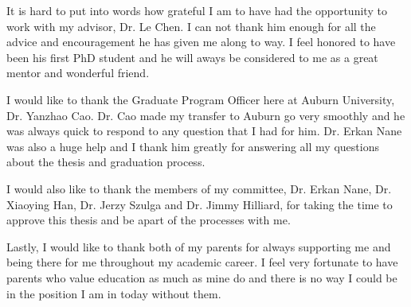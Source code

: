 \documentclass[12pt]{report}
\theoremstyle{plain}
\theoremstyle{definition}
\numberwithin{equation}{section}
\begin{document}
\begin{romanpages}
\begin{acknowledgments} 
It is hard to put into words how grateful I am to have had the opportunity to work with my advisor, Dr. Le Chen. I can not thank him enough for all the advice and encouragement he has given me along to way. I feel honored to have been his first PhD student and he will aways be considered to me as a great mentor and wonderful friend. \bigskip

I would like to thank the Graduate Program Officer here at Auburn University, Dr. Yanzhao Cao. Dr. Cao made my transfer to Auburn go very smoothly and he was always quick to respond to any question that I had for him. Dr. Erkan Nane was also a huge help and I thank him greatly for answering all my questions about the thesis and graduation process. \bigskip

I would also like to thank the members of my committee, Dr. Erkan Nane, Dr. Xiaoying Han, Dr. Jerzy Szulga and Dr. Jimmy Hilliard, for taking the time to approve this thesis and be apart of the processes with me. \bigskip

Lastly, I would like to thank both of my parents for always supporting me and being there for me throughout my academic career. I feel very fortunate to have parents who value education as much as mine do and there is no way I could be in the position I am in today without them. 
\end{acknowledgments}

\begin{singlespace}

\begin{center} 
\renewcommand{\cftchapfont}{}
\renewcommand{\cftchappagefont}{}
\renewcommand{\cfttoctitlefont}{\normalsize}%
\renewcommand{\cftsecfont }{\normalsize}%
\renewcommand{\cftsecpagefont}{\normalsize}%
\tableofcontents 
\newpage
\renewcommand{\cftchapfont}{}
\renewcommand{\cftchappagefont}{}
\renewcommand{\cftloftitlefont}{\normalsize}%
\renewcommand{\cftsecfont}{\normalsize}%
\renewcommand{\cftsecpagefont}{\normalsize}%
\listoffigures
\newpage
\renewcommand{\cftchapfont}{}
\renewcommand{\cftchappagefont}{}
\renewcommand{\cftlottitlefont}{\normalsize}%
\renewcommand{\cftsecfont}{\normalsize}%
\renewcommand{\cftsecpagefont}{\normalsize}%
\listoftables
\end{center}
\end{singlespace}
\printnomenclature[0.5in] %
\end{romanpages}        %
\end{document}
